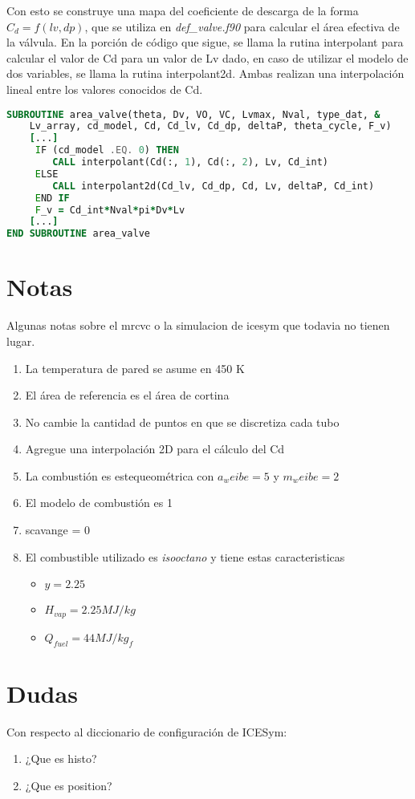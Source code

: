 Con esto se construye una mapa del coeficiente de descarga de la forma $C_d =
f(lv, dp)$, que se utiliza en \emph{def\_valve.f90} para calcular el área
efectiva de la válvula.
%
En la porción de código que sigue, se llama la rutina interpolant para calcular
el valor de Cd para un valor de Lv dado, en caso de utilizar el modelo de dos
variables, se llama la rutina interpolant2d.
%
Ambas realizan una interpolación lineal entre los valores conocidos de Cd.


\begin{lstlisting}[language=fortran]
SUBROUTINE area_valve(theta, Dv, VO, VC, Lvmax, Nval, type_dat, &
    Lv_array, cd_model, Cd, Cd_lv, Cd_dp, deltaP, theta_cycle, F_v)
    [...]
     IF (cd_model .EQ. 0) THEN
        CALL interpolant(Cd(:, 1), Cd(:, 2), Lv, Cd_int)
     ELSE
        CALL interpolant2d(Cd_lv, Cd_dp, Cd, Lv, deltaP, Cd_int)
     END IF
     F_v = Cd_int*Nval*pi*Dv*Lv
    [...]
END SUBROUTINE area_valve
\end{lstlisting}


\section{Notas}
Algunas notas sobre el mrcvc o la simulacion de icesym que todavia no tienen
lugar.

\begin{enumerate}
    \item La temperatura de pared se asume en 450 K
    \item El área de referencia es el área de cortina
    \item No cambie la cantidad de puntos en que se discretiza cada tubo
    \item Agregue una interpolación 2D para el cálculo del Cd
    \item La combustión es estequeométrica con $a_weibe=5$ y $m_weibe=2$
    \item El modelo de combustión es 1
    \item scavange = 0
    \item El combustible utilizado es \emph{isooctano} y tiene estas
        caracteristicas 
        \begin{itemize}
            \item $y = 2.25$
            \item $H_{vap} = 2.25 MJ/kg$
            \item $Q_{fuel} = 44 MJ/kg_f$
        \end{itemize}
\end{enumerate}

\section{Dudas}
Con respecto al diccionario de configuración de ICESym:

\begin{enumerate}
    \item ¿Que es histo?
    \item ¿Que es position?
\end{enumerate}

